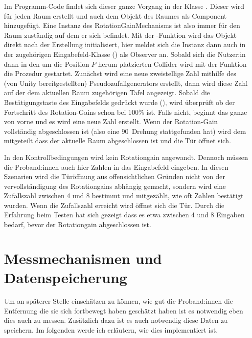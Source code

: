 Im Programm-Code findet sich dieser ganze Vorgang in der Klasse . Dieser wird für jeden Raum erstellt und auch dem Objekt des Raumes als Component hinzugefügt. Eine Instanz des RotationGainMechanisms ist also immer für den Raum zuständig auf dem er sich befindet. Mit der -Funktion wird das Objekt direkt nach der Erstellung initialisiert, hier meldet sich die Instanz dann auch in der zugehörigen Eingabefeld-Klasse () als Observer an. Sobald sich die Nutzer:in dann in den um die Position $P$ herum platzierten Collider wird mit der Funktion  die Prozedur gestartet. Zunächst wird eine neue zweistellige Zahl mithilfe des (von Unity bereitgestellten) Pseudozufallgenerators erstellt, dann wird diese Zahl auf der dem aktuellen Raum zugehörigen Tafel angezeigt. Sobald die Bestätigungstaste des Eingabefelds gedrückt wurde (\textquote{$\#$}), wird überprüft ob der Fortschritt des Rotation-Gains schon bei 100\% ist. Falls nicht, beginnt das ganze von vorne und es wird eine neue Zahl erstellt. Wenn der Rotation-Gain vollständig abgeschlossen ist (also eine 90\textdegree\ Drehung stattgefunden hat) wird dem  mitgeteilt dass der aktuelle Raum abgeschlossen ist und die Tür öffnet sich.

In den Kontrollbedingungen wird kein Rotationgain angewandt. Dennoch müssen die Proband:innen auch hier Zahlen in das Eingabefeld eingeben. In diesen Szenarien wird die Türöffnung aus offensichtlichen Gründen nicht von der vervollständigung des Rotationgains abhängig gemacht, sondern wird eine Zufallszahl zwischen 4 und 8 bestimmt und mitgezählt, wie oft Zahlen bestätigt wurden. Wenn die Zufallszahl erreicht wird öffnet sich die Tür. Durch die Erfahrung beim Testen hat sich gezeigt dass es etwa zwischen 4 und 8 Eingaben bedarf, bevor der Rotationgain abgeschlossen ist.

\section{Messmechanismen und Datenspeicherung}
Um an späterer Stelle einschätzen zu können, wie gut die Proband:innen die Entfernung die sie sich fortbewegt haben geschätzt haben ist es notwendig eben dies auch zu messen. Zusätzlich dazu ist es auch notwendig diese Daten zu speichern. Im folgenden werde ich erläutern, wie dies implementiert ist.

